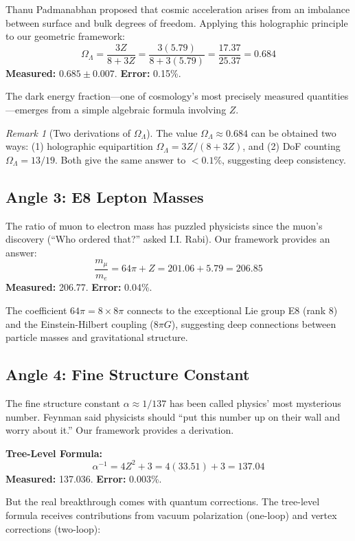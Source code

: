 \documentclass[11pt,a4paper]{article}
\theoremstyle{plain}
\theoremstyle{definition}
\theoremstyle{remark}
\newtheorem{remark}[theorem]{Remark}
\newcommand{\OmegaL}{\Omega_\Lambda}
\begin{document}
Thanu Padmanabhan proposed that cosmic acceleration arises from an imbalance between surface and bulk degrees of freedom. Applying this holographic principle to our geometric framework:
\[
\OmegaL = \frac{3Z}{8 + 3Z} = \frac{3(5.79)}{8 + 3(5.79)} = \frac{17.37}{25.37} = 0.684
\]
\textbf{Measured:} $0.685 \pm 0.007$. \textbf{Error:} 0.15\%.

The dark energy fraction---one of cosmology's most precisely measured quantities---emerges from a simple algebraic formula involving $Z$.

\begin{remark}[Two derivations of $\OmegaL$]
The value $\OmegaL \approx 0.684$ can be obtained two ways: (1) holographic equipartition $\OmegaL = 3Z/(8+3Z)$, and (2) DoF counting $\OmegaL = 13/19$. Both give the same answer to $<0.1\%$, suggesting deep consistency.
\end{remark}

\subsection{Angle 3: E8 Lepton Masses}

The ratio of muon to electron mass has puzzled physicists since the muon's discovery (``Who ordered that?'' asked I.I. Rabi). Our framework provides an answer:
\[
\frac{m_\mu}{m_e} = 64\pi + Z = 201.06 + 5.79 = 206.85
\]
\textbf{Measured:} 206.77. \textbf{Error:} 0.04\%.

The coefficient $64\pi = 8 \times 8\pi$ connects to the exceptional Lie group E8 (rank 8) and the Einstein-Hilbert coupling ($8\pi G$), suggesting deep connections between particle masses and gravitational structure.

\subsection{Angle 4: Fine Structure Constant}

The fine structure constant $\alpha \approx 1/137$ has been called physics' most mysterious number. Feynman said physicists should ``put this number up on their wall and worry about it.'' Our framework provides a derivation.

\textbf{Tree-Level Formula:}
\[
\alpha^{-1} = 4Z^2 + 3 = 4(33.51) + 3 = 137.04
\]
\textbf{Measured:} 137.036. \textbf{Error:} 0.003\%.

But the real breakthrough comes with quantum corrections. The tree-level formula receives contributions from vacuum polarization (one-loop) and vertex corrections (two-loop):
\end{document}

